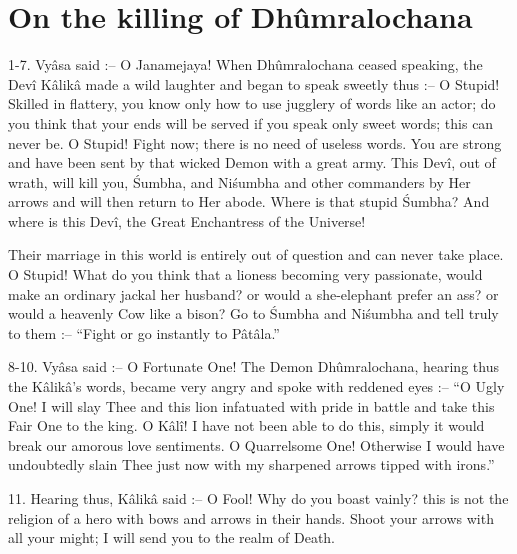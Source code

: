 ﻿\chapter{On the killing of Dh\^umralochana}

1-7. Vy\^asa said :-- O Janamejaya! When Dh\^umralochana ceased speaking, the Dev\^i K\^alik\^a made a wild laughter and began to speak sweetly thus :-- O Stupid! Skilled in flattery, you know only how to use jugglery of words like an actor; do you think that your ends will be served if you speak only sweet words; this can never be. O Stupid! Fight now; there is no need of useless words. You are strong and have been sent by that wicked Demon with a great army. This Dev\^i, out of wrath, will kill you, \'Sumbha, and Ni\'sumbha and other commanders by Her arrows and will then return to Her abode. Where is that stupid \'Sumbha? And where is this Dev\^i, the Great Enchantress of the Universe!

Their marriage in this world is entirely out of question and can never take place. O Stupid! What do you think that a lioness becoming very passionate, would make an ordinary jackal her husband? or would a she-elephant prefer an ass? or would a heavenly Cow like a bison? Go to \'Sumbha and Ni\'sumbha and tell truly to them :-- ``Fight or go instantly to P\^at\^ala.''

8-10. Vy\^asa said :-- O Fortunate One! The Demon Dh\^umralochana, hearing thus the K\^alik\^a's words, became very angry and spoke with reddened eyes :-- ``O Ugly One! I will slay Thee and this lion infatuated with pride in battle and take this Fair One to the king. O K\^al\^i! I have not been able to do this, simply it would break our amorous love sentiments. O Quarrelsome One! Otherwise I would have undoubtedly slain Thee just now with my sharpened arrows tipped with irons.''

11. Hearing thus, K\^alik\^a said :-- O Fool! Why do you boast vainly? this is not the religion of a hero with bows and arrows in their hands. Shoot your arrows with all your might; I will send you to the realm of Death.

